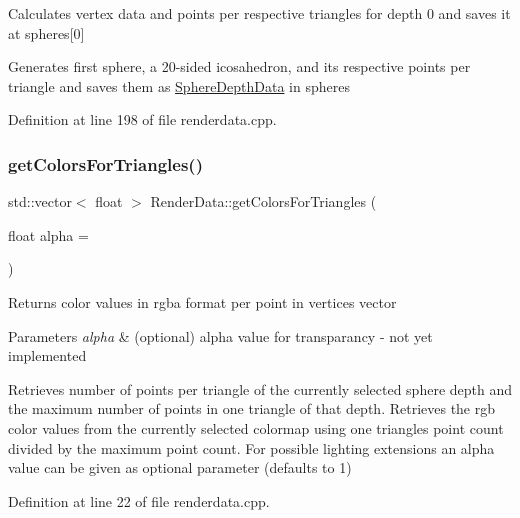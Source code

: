 Calculates vertex data and points per respective triangles for depth 0 and saves it at spheres\mbox{[}0\mbox{]}

Generates first \textquotesingle{}sphere\textquotesingle{}, a 20-\/sided icosahedron, and its respective points per triangle and saves them as \hyperlink{struct_sphere_depth_data}{Sphere\+Depth\+Data} in spheres 

Definition at line 198 of file renderdata.\+cpp.

\mbox{\label{class_render_data_a58fe3351334cd518b930dfe0a0aa8732}} 
\subsubsection{\texorpdfstring{get\+Colors\+For\+Triangles()}{getColorsForTriangles()}}
{\footnotesize\ttfamily std\+::vector$<$ float $>$ Render\+Data\+::get\+Colors\+For\+Triangles (\begin{DoxyParamCaption}\item[{float}]{alpha = {} }\end{DoxyParamCaption})}

\begin{DoxyReturn}{Returns}
color values in rgba format per point in vertices vector 
\end{DoxyReturn}

\begin{DoxyParams}{Parameters}
{\em alpha} & (optional) alpha value for transparancy -\/ not yet implemented\\
\hline
\end{DoxyParams}
Retrieves number of points per triangle of the currently selected sphere depth and the maximum number of points in one triangle of that depth. Retrieves the rgb color values from the currently selected colormap using one triangle\textquotesingle{}s point count divided by the maximum point count. For possible lighting extensions an alpha value can be given as optional parameter (defaults to 1) 

Definition at line 22 of file renderdata.\+cpp.

\mbox{\label{class_render_data_a1fffc72f3dd17ab052d4fb2f025ef5a0}} 
